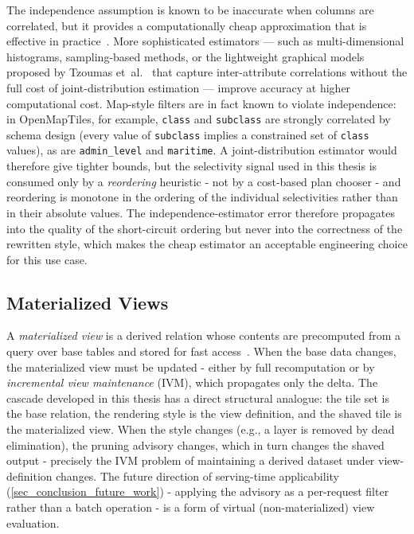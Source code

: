 The independence assumption is known to be inaccurate when columns are correlated, but it provides a computationally cheap approximation that is effective in practice~\cite{selingerAccessPathSelection1979}.
More sophisticated estimators --- such as multi-dimensional histograms, sampling-based methods, or the lightweight graphical models proposed by Tzoumas et~al.~\cite{tzoumas2011lightweight} that capture inter-attribute correlations without the full cost of joint-distribution estimation --- improve accuracy at higher computational cost.
Map-style filters are in fact known to violate independence: in OpenMapTiles, for example, \texttt{class} and \texttt{subclass} are strongly correlated by schema design (every value of \texttt{subclass} implies a constrained set of \texttt{class} values), as are \texttt{admin\_level} and \texttt{maritime}.
A joint-distribution estimator would therefore give tighter bounds, but the selectivity signal used in this thesis is consumed only by a \emph{reordering} heuristic - not by a cost-based plan chooser - and reordering is monotone in the ordering of the individual selectivities rather than in their absolute values.
The independence-estimator error therefore propagates into the quality of the short-circuit ordering but never into the correctness of the rewritten style, which makes the cheap estimator an acceptable engineering choice for this use case.

\subsection{Materialized Views}\label{sub_materialized_views}

A \emph{materialized view} is a derived relation whose contents are precomputed from a query over base tables and stored for fast access~\cite{guptaMaintenanceMaterializedViews1995}.
When the base data changes, the materialized view must be updated - either by full recomputation or by \emph{incremental view maintenance} (IVM), which propagates only the delta.
The cascade developed in this thesis has a direct structural analogue: the tile set is the base relation, the rendering style is the view definition, and the shaved tile is the materialized view.
When the style changes (e.g., a layer is removed by dead elimination), the pruning advisory changes, which in turn changes the shaved output - precisely the IVM problem of maintaining a derived dataset under view-definition changes.
The future direction of serving-time applicability (\cref{sec_conclusion_future_work}) - applying the advisory as a per-request filter rather than a batch operation - is a form of virtual (non-materialized) view evaluation.

